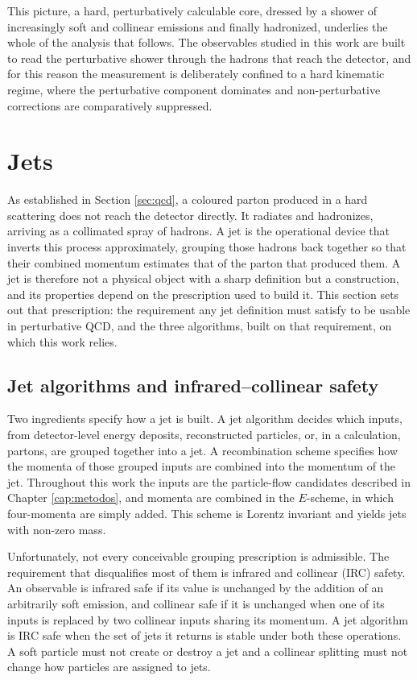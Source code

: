 This picture, a hard, perturbatively calculable core, dressed by a shower of
increasingly soft and collinear emissions and finally hadronized, underlies
the whole of the analysis that follows. The observables studied in this work are
built to read the perturbative shower through the hadrons that reach the
detector, and for this reason the measurement is deliberately confined to a hard
kinematic regime, where the perturbative component dominates and non-perturbative
corrections are comparatively suppressed.

\section{Jets}
\label{sec:jatos}

As established in Section \ref{sec:qcd}, a coloured parton produced in a hard
scattering does not reach the detector directly. It radiates and hadronizes,
arriving as a collimated spray of hadrons. A jet is the operational device that
inverts this process approximately, grouping those hadrons back together so that
their combined momentum estimates that of the parton that produced them. A jet is
therefore not a physical object with a sharp definition but a construction, and
its properties depend on the prescription used to build it. This section sets out
that prescription: the requirement any jet definition must satisfy to be usable
in perturbative QCD, and the three algorithms, built on that requirement, on
which this work relies.

\subsection{Jet algorithms and infrared--collinear safety}
\label{sec:ircsafety}

Two ingredients specify how a jet is built. A jet algorithm decides which
inputs, from detector-level energy deposits, reconstructed particles, or, in a
calculation, partons, are grouped together into a jet. A recombination
scheme specifies how the momenta of those grouped inputs are combined into the
momentum of the jet. Throughout this work the inputs are the particle-flow
candidates described in Chapter \ref{cap:metodos}, and momenta are combined in the
$E$-scheme, in which four-momenta are simply added. This scheme is Lorentz invariant
and yields jets with non-zero mass.

Unfortunately, not every conceivable grouping prescription is admissible.
The requirement that disqualifies most of them is infrared and collinear (IRC) safety.
An observable is infrared safe if its value is unchanged by the addition of an
arbitrarily soft emission, and collinear safe if it is unchanged when one
of its inputs is replaced by two collinear inputs sharing its momentum.
A jet algorithm is IRC safe when the set of jets it returns is stable under both
these operations. A soft particle must not create or destroy a jet and a
collinear splitting must not change how particles are assigned to jets.

